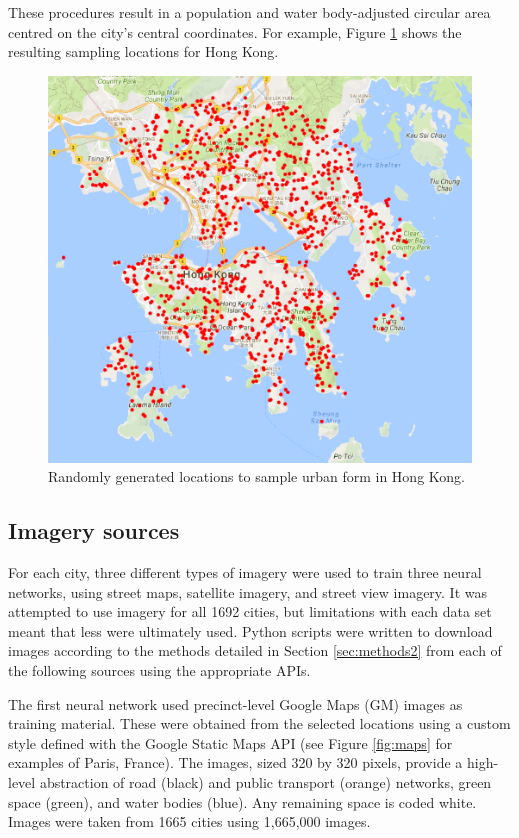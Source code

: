 \documentclass[sageh,times]{sagej}
\begin{document}
These procedures result in a population and water body-adjusted circular area centred on the city's central coordinates. For example, Figure \ref{fig:hongkong}  shows the resulting sampling locations for Hong Kong.



\begin{figure}[!htbp] 
    \centering    
\includegraphics[scale=1]{Images/HongKong.png} 
\caption{Randomly generated locations to sample urban form in Hong Kong.} 
\label{fig:hongkong}  
\end{figure}


\subsection{Imagery sources}\label{sec:methods3}

For each city, three different types of imagery were used to train three neural networks, using street maps, satellite imagery, and street view imagery. It was attempted to use imagery for all 1692 cities, but limitations with each data set meant that less were ultimately used. Python scripts were written to download images according to the methods detailed in Section \ref{sec:methods2} from each of the following sources using the appropriate APIs.

The first neural network used precinct-level Google Maps (GM) images as training material. These were obtained from the selected locations using a custom style defined with the Google Static Maps API \citep{GoogleStatic2017} (see Figure \ref{fig:maps} for examples of Paris, France). The images, sized 320 by 320 pixels, provide a high-level abstraction of road (black) and public transport (orange) networks, green space (green), and water bodies (blue). Any remaining space is coded white. Images were taken from 1665 cities using 1,665,000 images. 
\end{document}
